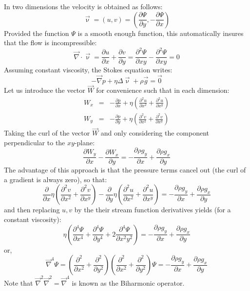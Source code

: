 In two dimensions the velocity is obtained as follows:
\begin{equation}
{\vec \upnu} = (u,v) = \left( \frac{\partial \Psi}{\partial y},-\frac{\partial \Psi}{\partial x} \right) 
\end{equation}
Provided the function $\Psi$ is a smooth enough function, 
this automatically insures that the flow is incompressible:
\begin{equation}
{\vec \nabla}\cdot {\vec \upnu} = 
\frac{\partial u}{\partial x} + \frac{\partial v}{\partial y}
=
\frac{\partial^2 \Psi}{\partial xy} - \frac{\partial^2 \Psi}{\partial xy} =0 
\end{equation}
Assuming constant viscosity, the Stokes equation writes:
\begin{equation}
-{\vec \nabla}p + \eta \Delta {\vec \upnu} + \rho {\vec g} = \vec{0}
\end{equation}
Let us introduce the vector ${\vec{W}}$ for convenience such that in each dimension:
\begin{eqnarray}
W_x&=&-\frac{\partial p}{\partial x} 
+ \eta\left( \frac{\partial^2 u}{\partial x^2} + \frac{\partial^2 u}{\partial x^y} \right) \\
W_y&=&-\frac{\partial p}{\partial y} 
+ \eta \left(\frac{\partial^2 v}{\partial x^2} + \frac{\partial^2 v}{\partial x^y} \right) 
\end{eqnarray}
Taking the curl of the vector ${\vec{W}}$ and only considering the component perpendicular to the $xy$-plane:
\begin{equation}
\frac{\partial W_y}{\partial x} - \frac{\partial W_x}{\partial y}  = 
-\frac{\partial \rho g_y}{\partial x} + \frac{\partial \rho g_x}{\partial y}   
\end{equation}
The advantage of this approach is that the pressure terms cancel out (the curl of a gradient is always zero), 
so that:
\begin{equation}
\frac{\partial}{\partial x}\eta\left( \frac{\partial^2 v}{\partial x^2} + \frac{\partial^2 v}{\partial x^y}  \right) 
- \frac{\partial }{\partial y} \eta \left( \frac{\partial^2 u}{\partial x^2} + \frac{\partial^2 u}{\partial x^y} \right) = 
-\frac{\partial \rho g_y}{\partial x} + \frac{\partial \rho g_x}{\partial y}   
\end{equation}
and then replacing $u,v$ by the their stream function derivatives yields (for a constant viscosity):
\begin{equation}
\eta \left(\frac{\partial^4 \Psi}{\partial x^4} + 
\frac{\partial^4 \Psi}{\partial y^4} + 
2\frac{\partial^4 \Psi}{\partial x^2y^2} \right)
=
-\frac{\partial \rho g_y}{\partial x} + \frac{\partial \rho g_x}{\partial y}   
\end{equation}
or, 
\begin{equation}
{\vec \nabla}^4 \Psi 
=
\left(\frac{\partial^2 }{\partial x^2} + \frac{\partial^2 }{\partial y^2} \right) 
\left(\frac{\partial^2 }{\partial x^2} + \frac{\partial^2 }{\partial y^2} \right) \Psi
=
-\frac{\partial \rho g_y}{\partial x} + \frac{\partial \rho g_x}{\partial y}   
\label{eq:sf1}
\end{equation}
Note that $\vec\nabla^2 \vec\nabla^2 = \vec\nabla^4 $ is known as the Biharmonic operator.

